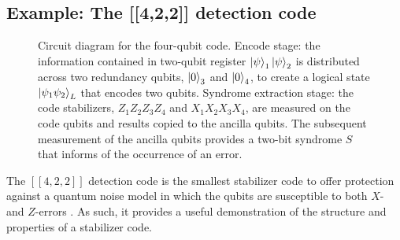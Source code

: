\documentclass[]{arxiv}
\theoremstyle{plain}%
\theoremstyle{definition}
\theoremstyle{remark}
\begin{document}
\subsection{Example: The [[4,2,2]] detection code}\label{sec:four_qubit}
\begin{figure}
	\centering
	
	\caption{Circuit diagram for the four-qubit code. Encode stage: the information contained in two-qubit register $\ket{\psi}_1\ket{\psi}_2$ is distributed across two redundancy qubits, $\ket{0}_3$ and $\ket{0}_4$, to create a logical state $\ket{\psi_1\psi_2}_L$ that encodes two qubits. Syndrome extraction stage: the code stabilizers, $Z_1Z_2Z_3Z_4$ and $X_1X_2X_3X_4$, are measured on the code qubits and results copied to the ancilla qubits. The subsequent measurement of the ancilla qubits provides a two-bit syndrome $S$ that informs of the occurrence of an error.}
	\label{fig:four_qubit}
\end{figure}

The $[[4,2,2]]$ detection code is the smallest stabilizer code to offer protection against a quantum noise model in which the qubits are susceptible to both $X$- and $Z$-errors \cite{Vaidman96,Grassl97}. As such, it provides a useful demonstration of the structure and properties of a stabilizer code.
\end{document}
